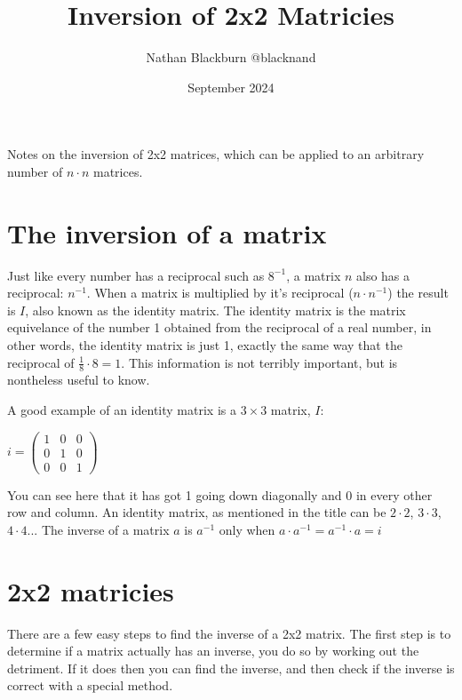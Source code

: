 \documentclass[options]{article}
\title{Inversion of 2x2 Matricies}
\author{Nathan Blackburn {@blacknand}}
\date{September 2024}
\begin{document}
\maketitle
Notes on the inversion of 2x2 matrices, which can be applied to an arbitrary number of \( n \cdot n \) matrices.
\vspace{-1em}
\section{The inversion of a matrix}
Just like every number has a reciprocal such as \(8^{-1}\), a matrix \(n\) also has a reciprocal: \(n^{-1}\). When a matrix
is multiplied by it's reciprocal (\(n \cdot n^{-1}\)) the result is \(I\), also known as the identity matrix. The identity matrix
is the matrix equivelance of the number 1 obtained from the reciprocal of a real number, in other words, the identity matrix is just 1, exactly the same
way that the reciprocal of \(\frac{1}{8} \cdot 8 = 1\). This information is not terribly important, but is nontheless useful to know.
\par


A good example of an identity matrix is a \( 3 \times 3 \) matrix, \( I \):

\begin{center}

    \(
        i = 
        \begin{pmatrix}
        1 & 0 & 0\\
        0 & 1 & 0\\
        0 & 0 & 1
        \end{pmatrix}
    \)

\end{center}

You can see here that it has got 1 going down diagonally and 0 in every other row and column. An identity
matrix, as mentioned in the title can be \(2 \cdot 2\), \(3 \cdot 3\), \(4 \cdot 4\)... The inverse of a matrix \(a\) is \(a^{-1}\) only when \(a \cdot a^{-1} = a^{-1} \cdot a = i\)

\section{2x2 matricies}
There are a few easy steps to find the inverse of a 2x2 matrix. The first step is to determine if a matrix actually has an inverse, you do so by working out the detriment. If it does then you can find the inverse, and then check if the inverse is correct with a special method.
\end{document}
